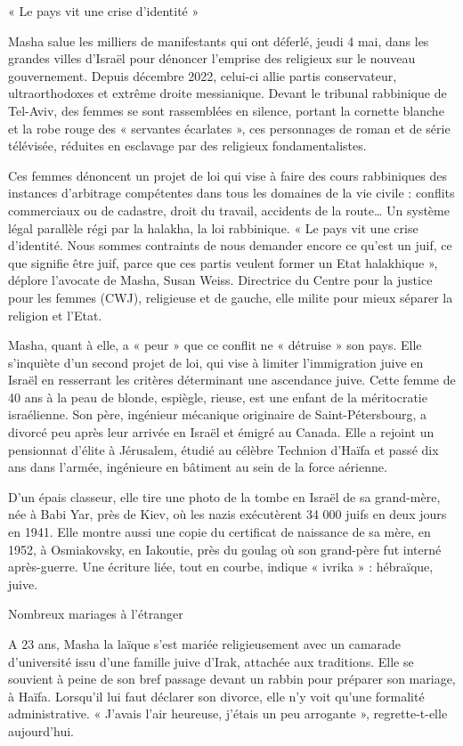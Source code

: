 « Le pays vit une crise d’identité »

Masha salue les milliers de manifestants qui ont déferlé, jeudi 4 mai, dans les grandes villes d’Israël pour dénoncer l’emprise des religieux sur le nouveau gouvernement. Depuis décembre 2022, celui-ci allie partis conservateur, ultraorthodoxes et extrême droite messianique. Devant le tribunal rabbinique de Tel-Aviv, des femmes se sont rassemblées en silence, portant la cornette blanche et la robe rouge des « servantes écarlates », ces personnages de roman et de série télévisée, réduites en esclavage par des religieux fondamentalistes.

Ces femmes dénoncent un projet de loi qui vise à faire des cours rabbiniques des instances d’arbitrage compétentes dans tous les domaines de la vie civile : conflits commerciaux ou de cadastre, droit du travail, accidents de la route… Un système légal parallèle régi par la halakha, la loi rabbinique. « Le pays vit une crise d’identité. Nous sommes contraints de nous demander encore ce qu’est un juif, ce que signifie être juif, parce que ces partis veulent former un Etat halakhique », déplore l’avocate de Masha, Susan Weiss. Directrice du Centre pour la justice pour les femmes (CWJ), religieuse et de gauche, elle milite pour mieux séparer la religion et l’Etat.

Masha, quant à elle, a « peur » que ce conflit ne « détruise » son pays. Elle s’inquiète d’un second projet de loi, qui vise à limiter l’immigration juive en Israël en resserrant les critères déterminant une ascendance juive. Cette femme de 40 ans à la peau de blonde, espiègle, rieuse, est une enfant de la méritocratie israélienne. Son père, ingénieur mécanique originaire de Saint-Pétersbourg, a divorcé peu après leur arrivée en Israël et émigré au Canada. Elle a rejoint un pensionnat d’élite à Jérusalem, étudié au célèbre Technion d’Haïfa et passé dix ans dans l’armée, ingénieure en bâtiment au sein de la force aérienne.

D’un épais classeur, elle tire une photo de la tombe en Israël de sa grand-mère, née à Babi Yar, près de Kiev, où les nazis exécutèrent 34 000 juifs en deux jours en 1941. Elle montre aussi une copie du certificat de naissance de sa mère, en 1952, à Osmiakovsky, en Iakoutie, près du goulag où son grand-père fut interné après-guerre. Une écriture liée, tout en courbe, indique « ivrika » : hébraïque, juive.

Nombreux mariages à l’étranger

A 23 ans, Masha la laïque s’est mariée religieusement avec un camarade d’université issu d’une famille juive d’Irak, attachée aux traditions. Elle se souvient à peine de son bref passage devant un rabbin pour préparer son mariage, à Haïfa. Lorsqu’il lui faut déclarer son divorce, elle n’y voit qu’une formalité administrative. « J’avais l’air heureuse, j’étais un peu arrogante », regrette-t-elle aujourd’hui.


